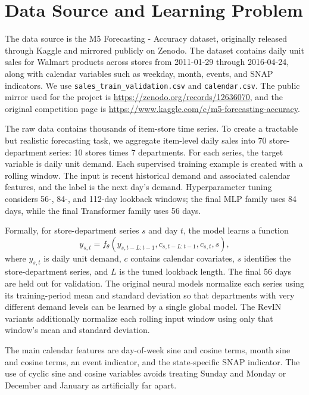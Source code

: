 \documentclass[11pt]{article}
\begin{document}
\section{Data Source and Learning Problem}

The data source is the M5 Forecasting - Accuracy dataset, originally released through Kaggle and mirrored publicly on Zenodo. The dataset contains daily unit sales for Walmart products across stores from 2011-01-29 through 2016-04-24, along with calendar variables such as weekday, month, events, and SNAP indicators. We use \texttt{sales\_train\_validation.csv} and \texttt{calendar.csv}. The public mirror used for the project is \url{https://zenodo.org/records/12636070}, and the original competition page is \url{https://www.kaggle.com/c/m5-forecasting-accuracy}.

The raw data contains thousands of item-store time series. To create a tractable but realistic forecasting task, we aggregate item-level daily sales into 70 store-department series: 10 stores times 7 departments. For each series, the target variable is daily unit demand. Each supervised training example is created with a rolling window. The input is recent historical demand and associated calendar features, and the label is the next day's demand. Hyperparameter tuning considers 56-, 84-, and 112-day lookback windows; the final MLP family uses 84 days, while the final Transformer family uses 56 days.

Formally, for store-department series $s$ and day $t$, the model learns a function
\begin{equation}
    y_{s,t} = f_{\theta}\left(y_{s,t-L:t-1}, c_{s,t-L:t-1}, c_{s,t}, s\right),
\end{equation}
where $y_{s,t}$ is daily unit demand, $c$ contains calendar covariates, $s$ identifies the store-department series, and $L$ is the tuned lookback length. The final 56 days are held out for validation. The original neural models normalize each series using its training-period mean and standard deviation so that departments with very different demand levels can be learned by a single global model. The RevIN variants additionally normalize each rolling input window using only that window's mean and standard deviation.

The main calendar features are day-of-week sine and cosine terms, month sine and cosine terms, an event indicator, and the state-specific SNAP indicator. The use of cyclic sine and cosine variables avoids treating Sunday and Monday or December and January as artificially far apart.
\end{document}
